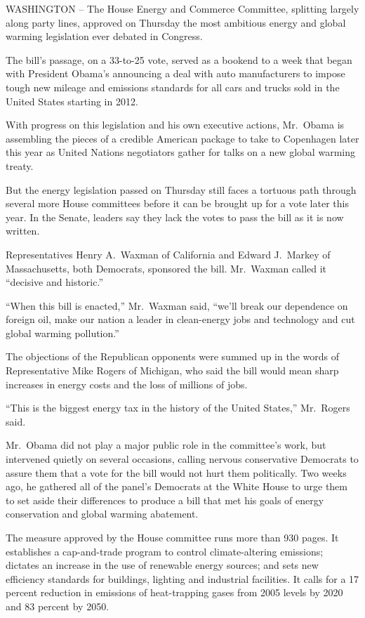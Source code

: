 \documentclass[12pt,a4paper,onecolumn]{article}
\begin{document}
WASHINGTON -- The House Energy and Commerce Committee, splitting largely along party lines, approved
on Thursday the most ambitious energy and global warming legislation ever debated in Congress.

The bill's passage, on a 33-to-25 vote, served as a bookend to a week that began with President
Obama's announcing a deal with auto manufacturers to impose tough new mileage and emissions
standards for all cars and trucks sold in the United States starting in 2012.

With progress on this legislation and his own executive actions, Mr.~Obama is assembling the pieces
of a credible American package to take to Copenhagen later this year as United Nations negotiators
gather for talks on a new global warming treaty.

But the energy legislation passed on Thursday still faces a tortuous path through several more House
committees before it can be brought up for a vote later this year. In the Senate, leaders say they
lack the votes to pass the bill as it is now written.

Representatives Henry A.~Waxman of California and Edward J.~Markey of Massachusetts, both Democrats,
sponsored the bill. Mr.~Waxman called it ``decisive and historic.''

``When this bill is enacted,'' Mr.~Waxman said, ``we'll break our dependence on foreign oil, make
our nation a leader in clean-energy jobs and technology and cut global warming pollution.''

The objections of the Republican opponents were summed up in the words of Representative Mike Rogers
of Michigan, who said the bill would mean sharp increases in energy costs and the loss of millions
of jobs.

``This is the biggest energy tax in the history of the United States,'' Mr.~Rogers said.

Mr.~Obama did not play a major public role in the committee's work, but intervened quietly on
several occasions, calling nervous conservative Democrats to assure them that a vote for the bill
would not hurt them politically. Two weeks ago, he gathered all of the panel's Democrats at the
White House to urge them to set aside their differences to produce a bill that met his goals of
energy conservation and global warming abatement.

The measure approved by the House committee runs more than 930 pages. It establishes a cap-and-trade
program to control climate-altering emissions; dictates an increase in the use of renewable energy
sources; and sets new efficiency standards for buildings, lighting and industrial facilities. It
calls for a 17 percent reduction in emissions of heat-trapping gases from 2005 levels by 2020 and 83
percent by 2050.
\end{document}
